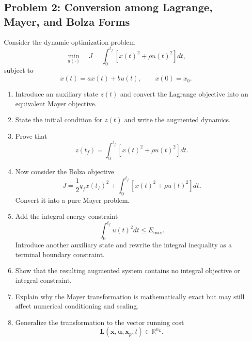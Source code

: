 \subsection*{Problem 2: Conversion among Lagrange, Mayer, and Bolza Forms}

Consider the dynamic optimization problem
\begin{equation}
\min_{u(\cdot)}
\quad
J
=
\int_0^{t_f}
\left[
x(t)^2
+
\rho u(t)^2
\right]dt,
\end{equation}
subject to
\begin{equation}
\dot{x}(t)=a x(t)+b u(t),
\qquad
x(0)=x_0.
\end{equation}

\begin{enumerate}
    \item Introduce an auxiliary state $z(t)$ and convert the Lagrange
    objective into an equivalent Mayer objective.

    \item State the initial condition for $z(t)$ and write the augmented
    dynamics.

    \item Prove that
    \begin{equation}
    z(t_f)
    =
    \int_0^{t_f}
    \left[
    x(t)^2+\rho u(t)^2
    \right]dt.
    \end{equation}

    \item Now consider the Bolza objective
    \begin{equation}
    J
    =
    \frac{1}{2}q_f x(t_f)^2
    +
    \int_0^{t_f}
    \left[
    x(t)^2+\rho u(t)^2
    \right]dt.
    \end{equation}
    Convert it into a pure Mayer problem.

    \item Add the integral energy constraint
    \begin{equation}
    \int_0^{t_f}u(t)^2dt
    \leq E_{\max}.
    \end{equation}
    Introduce another auxiliary state and rewrite the integral inequality
    as a terminal boundary constraint.

    \item Show that the resulting augmented system contains no integral
    objective or integral constraint.

    \item Explain why the Mayer transformation is mathematically exact but
    may still affect numerical conditioning and scaling.

    \item Generalize the transformation to the vector running cost
    \begin{equation}
    \mathbf{L}
    \left(
    \mathbf{x},
    \mathbf{u},
    \mathbf{x}_p,
    t
    \right)
    \in\mathbb{R}^{n_L}.
    \end{equation}
\end{enumerate}


